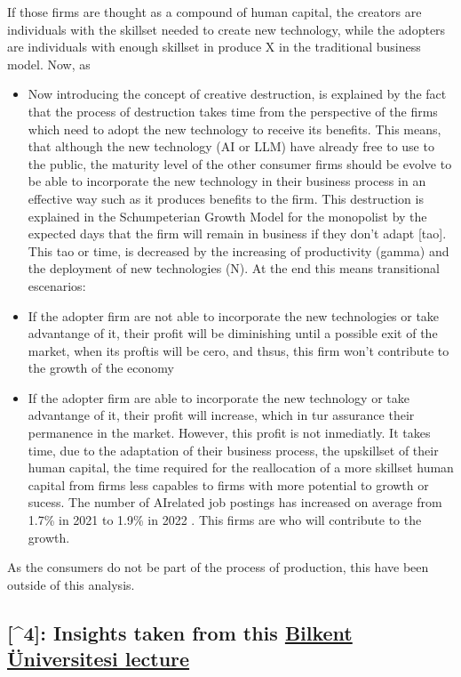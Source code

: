 \documentclass[preprint, 3p,
authoryear]{elsarticle} %
\providecommand{\tightlist}{%
  \setlength{\itemsep}{0pt}\setlength{\parskip}{0pt}}
\begin{document}
If those firms are thought as a compound of human capital, the creators
are individuals with the skillset needed to create new technology, while
the adopters are individuals with enough skillset in produce X in the
traditional business model. Now, as

\begin{itemize}
\tightlist
\item
  Now introducing the concept of creative destruction, is explained by
  the fact that the process of destruction takes time from the
  perspective of the firms which need to adopt the new technology to
  receive its benefits. This means, that although the new technology (AI
  or LLM) have already free to use to the public, the maturity level of
  the other consumer firms should be evolve to be able to incorporate
  the new technology in their business process in an effective way such
  as it produces benefits to the firm. This destruction is explained in
  the Schumpeterian Growth Model for the monopolist by the expected days
  that the firm will remain in business if they don't adapt {[}tao{]}.
  This tao or time, is decreased by the increasing of productivity
  (gamma) and the deployment of new technologies (N). At the end this
  means transitional escenarios:
\item
  If the adopter firm are not able to incorporate the new technologies
  or take advantange of it, their profit will be diminishing until a
  possible exit of the market, when its proftis will be cero, and thsus,
  this firm won't contribute to the growth of the economy
\item
  If the adopter firm are able to incorporate the new technology or take
  advantange of it, their profit will increase, which in tur assurance
  their permanence in the market. However, this profit is not
  inmediatly. It takes time, due to the adaptation of their business
  process, the upskillset of their human capital, the time required for
  the reallocation of a more skillset human capital from firms less
  capables to firms with more potential to growth or sucess. The number
  of AIrelated job postings has increased on average from 1.7\% in 2021
  to 1.9\% in 2022 \citep{reportAI}. This firms are who will contribute
  to the growth.
\end{itemize}

As the consumers do not be part of the process of production, this have
been outside of this analysis.

\hypertarget{insights-taken-from-this-bilkent-uxfcniversitesi-lecture}{%
\subsection{\texorpdfstring{{[}\^{}4{]}: Insights taken from this
\href{https://youtu.be/m3nkTrFF2zs?si=dgPJlvVgQuuQAcL8}{Bilkent
Üniversitesi
lecture}}{{[}\^{}4{]}: Insights taken from this Bilkent Üniversitesi lecture}}\label{insights-taken-from-this-bilkent-uxfcniversitesi-lecture}}
\end{document}
